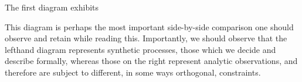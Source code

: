 



The first diagram exhibits 





This diagram is perhaps the most important side-by-side comparison one should
observe and retain while reading this. Importantly, we should observe that the
lefthand diagram represents synthetic processes, those which we decide and
describe formally, whereas those on the right represent analytic observations,
and therefore are subject to different, in some ways orthogonal, constraints.



